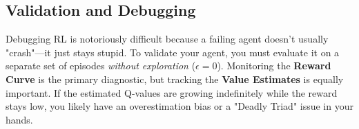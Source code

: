 \subsection{Validation and Debugging}
Debugging RL is notoriously difficult because a failing agent doesn't usually "crash"—it just stays stupid. To validate your agent, you must evaluate it on a separate set of episodes \textit{without exploration} ($\epsilon=0$). 
Monitoring the \textbf{Reward Curve} is the primary diagnostic, but tracking the \textbf{Value Estimates} is equally important. If the estimated Q-values are growing indefinitely while the reward stays low, you likely have an overestimation bias or a "Deadly Triad" issue in your hands.

